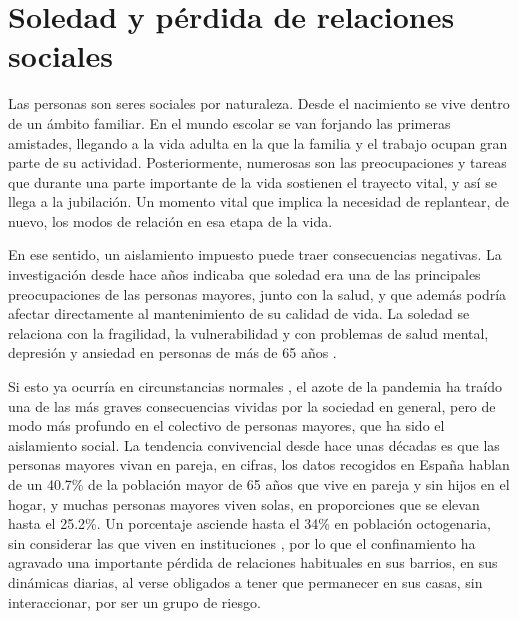 \documentclass{textolivre}
\begin{document}
\section{Soledad y pérdida de relaciones sociales}
Las personas son seres sociales por naturaleza. Desde el nacimiento se vive dentro de un ámbito familiar. En el mundo escolar se van forjando las primeras amistades, llegando a la vida adulta en la que la familia y el trabajo ocupan gran parte de su actividad. Posteriormente, numerosas son las preocupaciones y tareas que durante una parte importante de la vida sostienen el trayecto vital, y así se llega a la jubilación. Un momento vital que implica la necesidad de replantear, de nuevo, los modos de relación en esa etapa de la vida.

En ese sentido, un aislamiento impuesto puede traer consecuencias negativas. La investigación desde hace años indicaba que soledad era una de las principales preocupaciones de las personas mayores, junto con la salud, y que además podría afectar directamente al mantenimiento de su calidad de vida. La soledad se relaciona con la fragilidad, la vulnerabilidad y con problemas de salud mental, depresión y ansiedad en personas de más de 65 años \cite{etxeberria2020}. %

Si esto ya ocurría en circunstancias normales \cite{pochintesta2019}, %
el azote de la pandemia ha traído una de las más graves consecuencias vividas por la sociedad en general, pero de modo más profundo en el colectivo de personas mayores, que ha sido el aislamiento social. La tendencia convivencial desde hace unas décadas es que las personas mayores vivan en pareja, en cifras, los datos recogidos en España hablan de un 40.7\% de la población mayor de 65 años que  vive en pareja y sin hijos en el hogar, y muchas personas mayores viven solas, en proporciones que se elevan hasta el 25.2\%. Un porcentaje asciende hasta el 34\% en población octogenaria, sin considerar las que viven en instituciones \cite{ine2014}, %
por lo que el confinamiento ha agravado una importante pérdida de relaciones habituales en sus barrios, en sus dinámicas diarias, al verse obligados a tener que permanecer en sus casas, sin interaccionar, por ser un grupo de riesgo.
\end{document}
